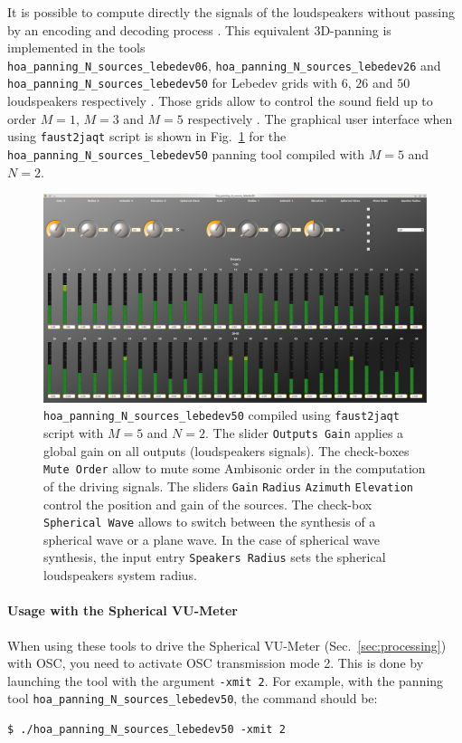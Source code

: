 \documentclass[10pt,a4paper]{article}
\begin{document}
It is possible to compute directly the signals of the loudspeakers without passing by an encoding and decoding process \cite{lecomte2015on}. This equivalent 3D-panning is implemented in the tools \\ \lstinline'hoa_panning_N_sources_lebedev06', \lstinline'hoa_panning_N_sources_lebedev26' and \\ \lstinline'hoa_panning_N_sources_lebedev50' for Lebedev grids with $6$, $26$ and $50$ loudspeakers respectively \cite{lebedev1975values,lecomte2015on}. Those grids allow to control the sound field up to order $M=1$, $M=3$ and $M=5$ respectively \cite{lecomte2015on}. 
The graphical user interface when using \lstinline'faust2jaqt' script is shown in Fig.~\ref{fig:hoa_panning_N_sources_lebedev50} for the \lstinline'hoa_panning_N_sources_lebedev50' panning tool compiled with $M=5$ and $N=2$.
\begin{figure}[!ht]
\includegraphics[width=\columnwidth]{hoa_panning_lebedev50.png}
\caption{\lstinline'hoa_panning_N_sources_lebedev50' compiled using \lstinline'faust2jaqt' script with $M=5$ and $N=2$. The slider \lstinline'Outputs Gain' applies a global gain on all outputs (loudspeakers signals). The check-boxes \lstinline'Mute Order' allow to mute some Ambisonic order in the computation of the driving signals. The sliders \lstinline'Gain' \lstinline'Radius' \lstinline'Azimuth' \lstinline'Elevation' control the position and gain of the sources. The check-box \lstinline'Spherical Wave' allows to switch between the synthesis of a spherical wave or a plane wave. In the case of spherical wave synthesis, the input entry \lstinline'Speakers Radius' sets the spherical loudspeakers system radius.}
\label{fig:hoa_panning_N_sources_lebedev50}
\end{figure}
\paragraph{Usage with the Spherical VU-Meter}
When using these tools to drive the Spherical VU-Meter (Sec.~\ref{sec:processing}) with OSC, you need to activate OSC transmission mode 2. This is done by launching the tool with the argument \lstinline'-xmit 2'. For example, with the panning tool \lstinline'hoa_panning_N_sources_lebedev50', the command should be:
\begin{lstlisting}
$ ./hoa_panning_N_sources_lebedev50 -xmit 2
\end{lstlisting}
\pagebreak
\end{document}
